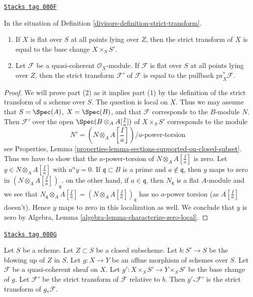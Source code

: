 \begin{lemma}
\label{divisors-lemma-strict-transform-flat}
\href{https://stacks.math.columbia.edu/tag/080F}{\texttt{Stacks tag 080F}}

In the situation of Definition \ref{divisors-definition-strict-transform}.
\begin{enumerate}
\item If $X$ is flat over $S$ at all points lying over $Z$, then
the strict transform of $X$ is equal to the base change $X \times_S S'$.
\item Let $\mathcal{F}$ be a quasi-coherent $\mathcal{O}_X$-module.
If $\mathcal{F}$ is flat over $S$ at all points lying over $Z$, then
the strict transform $\mathcal{F}'$ of $\mathcal{F}$ is equal to the
pullback $\text{pr}_X^*\mathcal{F}$.
\end{enumerate}
\end{lemma}

\begin{proof}
We will prove part (2) as it implies part (1) by the definition of the
strict transform of a scheme over $S$. The question is local on $X$.
Thus we may assume that $S = \Spec(A)$, $X = \Spec(B)$, and that
$\mathcal{F}$ corresponds to the $B$-module $N$. Then $\mathcal{F}'$
over the open $\Spec(B \otimes_A A[\frac{I}{a}])$ of $X \times_S S'$
corresponds to the module
$$
N' = (N \otimes_A A[\textstyle{\frac{I}{a}}])/a\text{-power-torsion}
$$
see Properties, Lemma
\ref{properties-lemma-sections-supported-on-closed-subset}.
Thus we have to show that the $a$-power-torsion of
$N \otimes_A A[\frac{I}{a}]$ is zero. Let $y \in N \otimes_A A[\frac{I}{a}]$
with $a^n y = 0$. If $\mathfrak q \subset B$
is a prime and $a \not \in \mathfrak q$, then $y$ maps to
zero in $(N \otimes_A A[\frac{I}{a}])_\mathfrak q$. on the other hand,
if $a \in \mathfrak q$, then $N_\mathfrak q$ is a flat $A$-module
and we see that
$N_\mathfrak q \otimes_A A[\frac{I}{a}]
=(N \otimes_A A[\frac{I}{a}])_\mathfrak q$
has no $a$-power torsion (as $A[\frac{I}{a}]$ doesn't).
Hence $y$ maps to zero in this localization as well. We conclude that
$y$ is zero by
Algebra, Lemma \ref{algebra-lemma-characterize-zero-local}.
\end{proof}

\begin{lemma}
\label{divisors-lemma-strict-transform-affine}
\href{https://stacks.math.columbia.edu/tag/080G}{\texttt{Stacks tag 080G}}

Let $S$ be a scheme. Let $Z \subset S$ be a closed subscheme.
Let $b : S' \to S$ be the blowing up of $Z$ in $S$. Let
$g : X \to Y$ be an affine morphism of schemes over $S$.
Let $\mathcal{F}$ be a quasi-coherent sheaf on $X$.
Let $g' : X \times_S S' \to Y \times_S S'$ be the base change
of $g$. Let $\mathcal{F}'$ be the strict transform of $\mathcal{F}$
relative to $b$. Then $g'_*\mathcal{F}'$ is the strict transform
of $g_*\mathcal{F}$.
\end{lemma}


